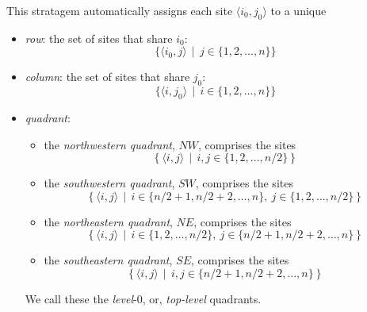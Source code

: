 \begin{enumerate}
{\begin{itemize}
\smallskip

This stratagem automatically assigns each site $\langle i_0, j_0 \rangle$ to a unique
    \begin{itemize}
    \item
{\em row}: the set of sites that share $i_0$:
\[ \{ \langle i_0, j \rangle \ \ | \ \ j \in \{1, 2, \ldots, n\} \} \]
    \medskip\item
{\em column}: the set of sites that share $j_0$:
\[ \{ \langle i, j_0 \rangle \ \ | \ \ i \in \{1, 2, \ldots, n\} \} \]
    \medskip\item    
{\em quadrant}:
            \begin{itemize}
            \item
the {\em northwestern quadrant}, $NW$, comprises the sites
\[ \left\{ \langle i,j \rangle \ \ | \ \ i, j \in \{1, 2, \ldots, n/2 \} \right\} \]

            \medskip\item
the {\em southwestern quadrant}, $SW$, comprises the sites
\[ \left\{ \langle i,j \rangle \ \ | \ \ i \in \{ n/2 +1, n/2+2, \ldots, n \}, \ j \in \{1, 2, \ldots, n/2 \} \right\} \]

            \medskip\item
the {\em northeastern quadrant}, $NE$, comprises the sites
\[ \left\{ \langle i,j \rangle \ \ | \ \ i \in \{1, 2, \ldots, n/2 \}, \ j \in \{ n/2 +1, n/2+2, \ldots, n \}  \right\} \]

            \medskip\item
the {\em southeastern quadrant}, $SE$, comprises the sites
\[ \left\{ \langle i,j \rangle \ \ | \ \ i, j \in \{ n/2 +1, n/2+2, \ldots, n \} \right\} \]
          \end{itemize}

We call these the {\em level}-$0$, or, {\em top-level} quadrants.


\end{itemize}
\end{itemize}}
\end{enumerate}
